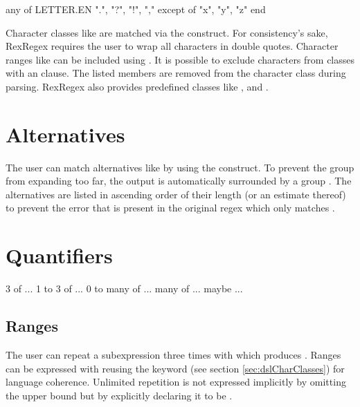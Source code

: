 \begin{rexregexBox}[label=code:dslCharClasses,title=Character classes,width=10cm,center]
any of
    LETTER.EN
    ".", "?", "!", ","
except of
    "x", "y", "z"
end
\end{rexregexBox}

Character classes like \pattern{[abc]} are matched via the  construct. For consistency's sake, RexRegex requires the user to wrap all characters in double quotes. Character ranges like \pattern{[a-z]} can be included using . It is possible to exclude characters from classes with an  clause. The listed members are removed from the character class during parsing. RexRegex also provides predefined classes like ,  and . 

\section{Alternatives}

The user can match alternatives like  by using the  construct. To prevent the group from expanding too far, the output is automatically surrounded by a group . The alternatives are listed in ascending order of their length (or an estimate thereof) to prevent the error that is present in the original regex which only matches .

\section{Quantifiers}

\begin{rexregexBox}[title={Quantifiers in RexRegex},label=code:quantifiersInRexRegex,width=10cm,center]
3 of ...
1 to 3 of ...
0 to many of ...
many of ...
maybe ...
\end{rexregexBox}

\subsection{Ranges} \label{sec:dslQuantifierRanges}

The user can repeat a subexpression three times with  which produces . Ranges can be expressed with  reusing the  keyword (see section \ref{sec:dslCharClasses}) for language coherence. Unlimited repetition is not expressed implicitly by omitting the upper bound  but by explicitly declaring it to be .

